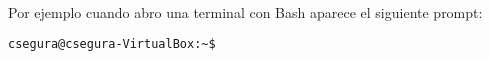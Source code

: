 \documentclass[10pt,letterpaper]{article}
\begin{document}
Por ejemplo cuando abro una terminal con Bash aparece el siguiente prompt:

\begin{lstlisting}[language=Bash]
csegura@csegura-VirtualBox:~$
\end{lstlisting}


	
\end{document}
